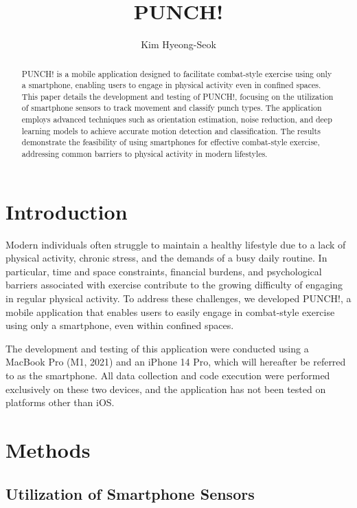 \documentclass{article}
\title{PUNCH!}
\author{Kim Hyeong-Seok}
\begin{document}
\maketitle

\begin{abstract}
    PUNCH! is a mobile application designed to facilitate combat-style exercise using only a smartphone, enabling users to engage in physical activity even in confined spaces. This paper details the development and testing of PUNCH!, focusing on the utilization of smartphone sensors to track movement and classify punch types. The application employs advanced techniques such as orientation estimation, noise reduction, and deep learning models to achieve accurate motion detection and classification. The results demonstrate the feasibility of using smartphones for effective combat-style exercise, addressing common barriers to physical activity in modern lifestyles.
\end{abstract}

\section{Introduction}

Modern individuals often struggle to maintain a healthy lifestyle due to a lack of physical activity, chronic stress, and the demands of a busy daily routine. In particular, time and space constraints, financial burdens, and psychological barriers associated with exercise contribute to the growing difficulty of engaging in regular physical activity. To address these challenges, we developed PUNCH!, a mobile application that enables users to easily engage in combat-style exercise using only a smartphone, even within confined spaces.

The development and testing of this application were conducted using a MacBook Pro (M1, 2021) and an iPhone 14 Pro, which will hereafter be referred to as the smartphone. All data collection and code execution were performed exclusively on these two devices, and the application has not been tested on platforms other than iOS.

\section{Methods}

\subsection{Utilization of Smartphone Sensors}
\end{document}
